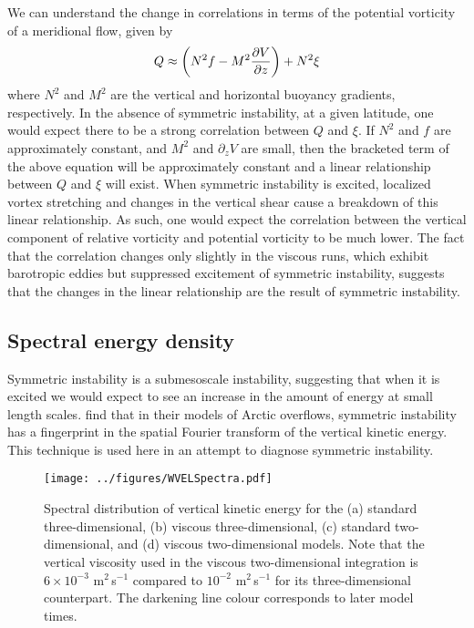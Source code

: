 We can understand the change in correlations in terms of the potential vorticity of a meridional flow, given by
\begin{equation}
    Q \approx \bigg(N^2 f - M^2 \pdv{V}{z} \bigg) + N^2 \xi
\end{equation}
where $N^2$ and $M^2$ are the vertical and horizontal buoyancy gradients, respectively. In the absence of symmetric instability, at a given latitude, one would expect there to be a strong correlation between $Q$ and $\xi$. If $N^2$ and $f$ are approximately constant, and $M^2$ and $\partial_z V$ are small, then the bracketed term of the above equation will be approximately constant and a linear relationship between $Q$ and $\xi$ will exist. When symmetric instability is excited, localized vortex stretching and changes in the vertical shear cause a breakdown of this linear relationship. As such, one would expect the correlation between the vertical component of relative vorticity and potential vorticity to be much lower. The fact that the correlation changes only slightly in the viscous runs, which exhibit barotropic eddies but suppressed excitement of symmetric instability, suggests that the changes in the linear relationship are the result of symmetric instability.

\subsection{Spectral energy density}
Symmetric instability is a submesoscale instability, suggesting that when it is excited we would expect to see an increase in the amount of energy at small length scales. \citet{Yankovsky2019} find that in their models of Arctic overflows, symmetric instability has a fingerprint in the spatial Fourier transform of the vertical kinetic energy. This technique is used here in an attempt to diagnose symmetric instability.

\begin{figure}[p]
    \centering
    \texttt{[image: ../figures/WVELSpectra.pdf]}
    \caption{Spectral distribution of vertical kinetic energy for the (a) standard three-dimensional, (b) viscous three-dimensional, (c) standard two-dimensional, and (d) viscous two-dimensional models. Note that the vertical viscosity used in the viscous two-dimensional integration is $6 \times 10^{-3}$ m$^2\,$s$^{-1}$ compared to $10^{-2}$ m$^2\,$s$^{-1}$ for its three-dimensional counterpart. The darkening line colour corresponds to later model times.}
    \label{fig:SpectralEnergyDensity}
\end{figure}


